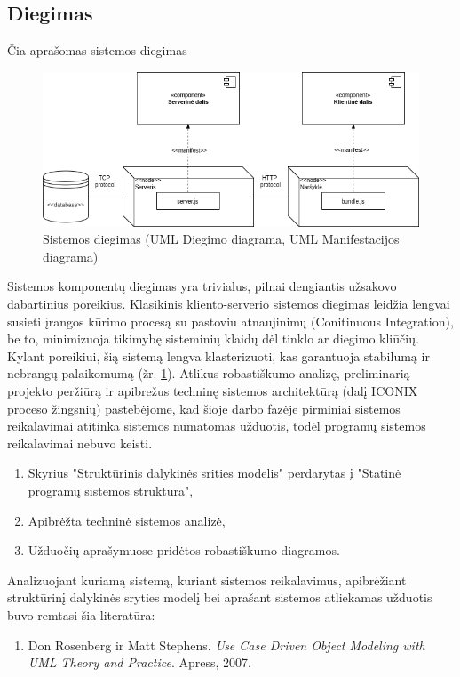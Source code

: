 \documentclass{VUMIFPSkursinis}
\begin{document}
      \subsection{Diegimas}
      Čia aprašomas sistemos diegimas
        \begin{figure}[H]
          \centering
          \includegraphics[scale=0.7]{img/Diegimas}
          \caption{Sistemos diegimas (UML Diegimo diagrama, UML Manifestacijos diagrama)}
          \label{deployment}
        \end{figure}
        Sistemos komponentų diegimas yra trivialus, pilnai dengiantis užsakovo dabartinius poreikius. Klasikinis kliento-serverio sistemos diegimas leidžia lengvai susieti įrangos kūrimo procesą su pastoviu atnaujinimų (Conitinuous Integration), be to, minimizuoja tikimybę sisteminių klaidų dėl tinklo ar diegimo kliūčių. Kylant poreikiui, šią sistemą lengva klasterizuoti, kas garantuoja stabilumą ir nebrangų palaikomumą (žr. \ref{deployment}).
			Atlikus robastiškumo analizę, preliminarią projekto peržiūrą ir apibrežus techninę sistemos architektūrą (dalį ICONIX proceso žingsnių) pastebėjome, kad šioje darbo fazėje pirminiai sistemos reikalavimai atitinka sistemos numatomas užduotis, todėl programų sistemos reikalavimai nebuvo keisti.
			
			\begin{enumerate}
				\item Skyrius "Struktūrinis dalykinės srities modelis" perdarytas į "Statinė programų sistemos struktūra",
				\item Apibrėžta techninė sistemos analizė,
				\item Užduočių aprašymuose pridėtos robastiškumo diagramos.
			\end{enumerate}
        Analizuojant kuriamą sistemą, kuriant sistemos reikalavimus, apibrėžiant struktūrinį dalykinės sryties modelį bei aprašant sistemos atliekamas užduotis buvo remtasi šia literatūra:
            \begin{enumerate}
                \item Don Rosenberg ir Matt Stephens. \textit{Use Case Driven Object Modeling with UML Theory and Practice}. Apress, 2007.
            \end{enumerate}
      
    
\end{document}
